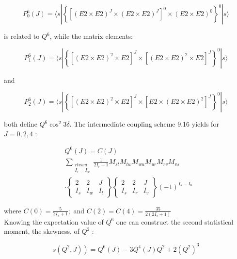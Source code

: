 \documentclass[10pt]{article}
\begin{document}
\begin{equation*}
P_{0}^{6}(J)=\langle s|\left\{\left[(E 2 \times E 2)^{J} \times(E 2 \times E 2)^{J}\right]^{0} \times(E 2 \times E 2)^{0}\right\}^{0}|s\rangle \tag{9.16}
\end{equation*}


is related to $Q^{6}$, while the matrix elements:


\begin{equation*}
P_{1}^{6}(J)=\langle s|\left\{\left[(E 2 \times E 2)^{2} \times E 2\right]^{J} \times\left[(E 2 \times E 2)^{2} \times E 2\right]^{J}\right\}^{0}|s\rangle \tag{9.17}
\end{equation*}


and


\begin{equation*}
P_{2}^{6}(J)=\langle s|\left\{\left[(E 2 \times E 2)^{2} \times E 2\right]^{J} \times\left[E 2 \times(E 2 \times E 2)^{2}\right]^{J}\right\}^{0}|s\rangle \tag{9.18}
\end{equation*}


both define $Q^{6} \cos ^{2} 3 \delta$. The intermediate coupling scheme 9.16 yields for $J=0,2,4$ :


\begin{align*}
& Q^{6}(J)=C(J) \\
& \sum_{\substack{r t v w u \\
I_{r}=I_{w}}} \frac{1}{2 I_{r}+1} M_{s t} M_{t w} M_{w u} M_{u r} M_{r v} M_{v s}  \tag{9.19}\\
& \cdot\left\{\begin{array}{ccc}
2 & 2 & J \\
I_{s} & I_{w} & I_{t}
\end{array}\right\}\left\{\begin{array}{ccc}
2 & 2 & J \\
I_{s} & I_{r} & I_{v}
\end{array}\right\}(-1)^{I_{s}-I_{u}}
\end{align*}


where $C(0)=\frac{5}{2 I_{s}+1} ;$ and $C(2)=C(4)=\frac{35}{2\left(2 I_{s}+1\right)}$\\
Knowing the expectation value of $Q^{6}$ one can construct the second statistical moment, the skewness, of $Q^{2}$ :


\begin{equation*}
\left.s\left(Q^{2}, J\right)\right)=Q^{6}(J)-3 Q^{4}(J) Q^{2}+2\left(Q^{2}\right)^{3} \tag{9.20}
\end{equation*}
\end{document}
